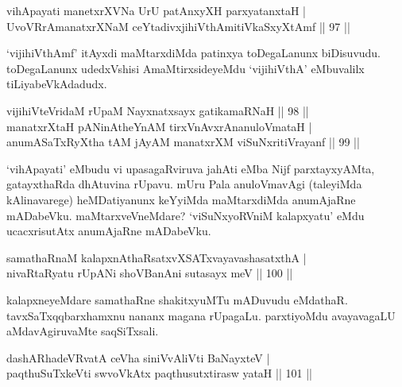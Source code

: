 
\begin{shl}
vihApayati manetxrXVNa UrU patAnxyXH parxyatanxtaH | \\
UvoVRrAmanatxrXNaM ceYtadivxjihiVthAmitiVkaSxyXtAmf \hfill|| 97 || 
\end{shl}

\begin{artha}
`vijihiVthAmf' itAyxdi maMtarxdiMda patinxya toDegaLanunx biDisuvudu. 
toDegaLanunx udedxVshisi AmaMtirxsideyeMdu `vijihiVthA' eMbuvalilx 
tiLiyabeVkAdadudx.
\end{artha}


\begin{shl}
vijihiVteVridaM rUpaM Nayxnatxsayx gatikamaRNaH \hfill|| 98 || \\
manatxrXtaH pANinA\s theYnAM tirxVnAvxrAnanuloVmataH | \\
anumASaTxRyXtha tAM jAyAM manatxrXM viSuNxritiVrayanf \hfill|| 99 || 
\end{shl}

\begin{artha}
`vihApayati' eMbudu vi upasagaRviruva ja{hA}ti eMba Nijf parxtayxyAMta, 
gatayxthaRda dhAtuvina rUpavu. mUru Pala anuloVmavAgi (taleyiMda 
kAlinavarege) heMDatiyanunx keYyiMda maMtarxdiMda anumAjaRne 
mADabeVku. maMtarxveVneMdare? `viSuNxyoRVniM kalapxyatu' eMdu 
ucacxrisutAtx anumAjaRne mADabeVku.
\end{artha}


\begin{shl}
samathaRnaM kalapxnAthaRsatxvXSATx\s vayavashasatxthA | \\
nivaRtaRyatu rUpANi shoVBanAni sutasayx meV \hfill|| 100 || 
\end{shl}

\begin{artha}
kalapxneyeMdare samathaRne shakitxyuMTu mADuvudu eMdathaR. 
tavxSaTxqqbarxhamxnu nananx magana rUpagaLu. parxtiyoMdu avayavagaLU 
aMdavAgiruvaMte saqSiTxsali.
\end{artha}


\begin{shl}
dashARhadeVRvatA ceVha siniVvAliVti BaNayxteV | \\
paqthuSuTxkeVti swvoVkAtx paqthusutxtirasw yataH \hfill|| 101 || 
\end{shl}

